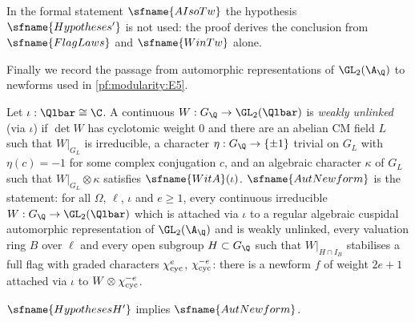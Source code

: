 \begin{remark}\label{pf:modularity:rem-aisotw}
In the formal statement $\sfname{AIsoTw}$ the hypothesis $\sfname{Hypotheses'}$ is not used: the proof derives the
conclusion from $\sfname{FlagLaws}$ and $\sfname{WinTw}$ alone.
\end{remark}

Finally we record the passage from automorphic representations of $\GL_2(\A_\Q)$ to newforms used in
\ref{pf:modularity:E5}.

\begin{definition}\label{pf:modularity:autnewdef}
Let $\iota:\Qlbar\cong\C$. A continuous $W:G_\Q\to\GL_2(\Qlbar)$ is \emph{weakly unlinked} (via $\iota$) if $\det W$ has
cyclotomic weight $0$ and there are an abelian CM field $L$ such that $W|_{G_L}$ is irreducible, a character
$\eta:G_\Q\to\{\pm1\}$ trivial on $G_L$ with $\eta(c)=-1$ for some complex conjugation $c$, and an algebraic character
$\kappa$ of $G_L$ such that $W|_{G_L}\otimes\kappa$ satisfies $\sfname{WitA}(\iota)$. $\sfname{AutNewform}$ is the statement:
for all $\Omega$, $\ell$, $\iota$ and $e\ge1$, every continuous irreducible $W:G_\Q\to\GL_2(\Qlbar)$ which is attached via
$\iota$ to a regular algebraic cuspidal automorphic representation of $\GL_2(\A_\Q)$ and is weakly unlinked, every
valuation ring $B$ over $\ell$ and every open subgroup $H\subset G_\Q$ such that $W|_{H\cap I_B}$ stabilises a full flag
with graded characters $\chi_{\mathrm{cyc}}^{e}$, $\chi_{\mathrm{cyc}}^{-e}$: there is a newform $f$ of weight $2e+1$ attached via
$\iota$ to $W\otimes\chi_{\mathrm{cyc}}^{-e}$.
\end{definition}

\begin{theorem}\label{pf:modularity:autnew}
$\sfname{HypothesesH'}$ implies $\sfname{AutNewform}$.
\end{theorem}

